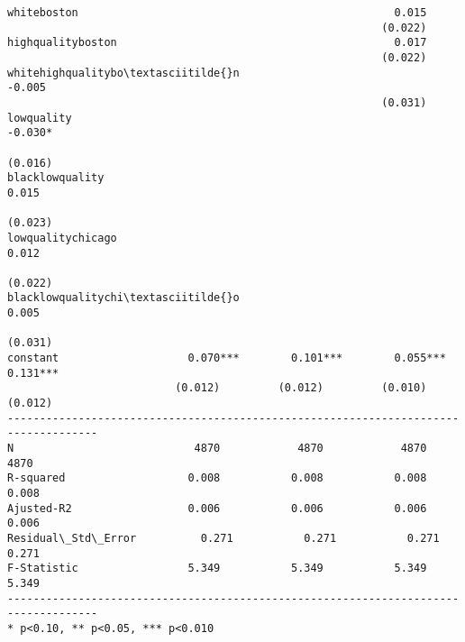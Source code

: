 \documentclass[11pt,notitlepage]{article}\usepackage[]{graphicx}\usepackage[]{color}
\makeatletter
\newenvironment{kframe}{%
 \def\at@end@of@kframe{}%
 \ifinner\ifhmode%
  \def\at@end@of@kframe{\end{minipage}}%
  \begin{minipage}{\columnwidth}%
 \fi\fi%
 \def\FrameCommand##1{\hskip\@totalleftmargin \hskip-\fboxsep
 \colorbox{shadecolor}{##1}\hskip-\fboxsep
     \hskip-\linewidth \hskip-\@totalleftmargin \hskip\columnwidth}%
 \MakeFramed {\advance\hsize-\width
   \@totalleftmargin\z@ \linewidth\hsize
   \@setminipage}}%
 {\par\unskip\endMakeFramed%
 \at@end@of@kframe}
\newenvironment{knitrout}{}{} %
\makeatother
\begin{document}
\begin{enumerate}[a)]
\begin{knitrout}
\begin{kframe}
\begin{footnotesize}
\begin{Verbatim}[commandchars=\\\{\}]
whiteboston                                                 0.015                   
                                                          (0.022)                   
highqualityboston                                           0.017                   
                                                          (0.022)                   
whitehighqualitybo\textasciitilde{}n                                       -0.005                   
                                                          (0.031)                   
lowquality                                                                 -0.030*  
                                                                          (0.016)   
blacklowquality                                                             0.015   
                                                                          (0.023)   
lowqualitychicago                                                           0.012   
                                                                          (0.022)   
blacklowqualitychi\textasciitilde{}o                                                        0.005   
                                                                          (0.031)   
constant                    0.070***        0.101***        0.055***        0.131***
                          (0.012)         (0.012)         (0.010)         (0.012)   
------------------------------------------------------------------------------------
N                            4870            4870            4870            4870   
R-squared                   0.008           0.008           0.008           0.008   
Ajusted-R2                  0.006           0.006           0.006           0.006   
Residual\_Std\_Error          0.271           0.271           0.271           0.271   
F-Statistic                 5.349           5.349           5.349           5.349   
------------------------------------------------------------------------------------
* p<0.10, ** p<0.05, *** p<0.010

    \end{Verbatim}
\end{footnotesize}

\end{kframe}
\end{knitrout}
\end{enumerate}
\end{document}
